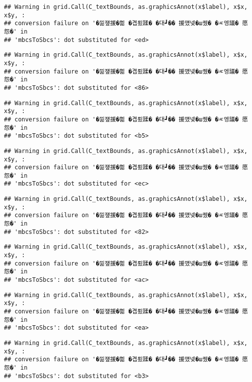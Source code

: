 \documentclass[
]{article}
\begin{document}
\begin{verbatim}
## Warning in grid.Call(C_textBounds, as.graphicsAnnot(x$label), x$x, x$y, :
## conversion failure on '�낆쟾援�쁾 �곕룄蹂� �대┛�� 援먰넻�ш퀬� �ㅼ엥議� 愿怨�' in
## 'mbcsToSbcs': dot substituted for <ed>
\end{verbatim}

\begin{verbatim}
## Warning in grid.Call(C_textBounds, as.graphicsAnnot(x$label), x$x, x$y, :
## conversion failure on '�낆쟾援�쁾 �곕룄蹂� �대┛�� 援먰넻�ш퀬� �ㅼ엥議� 愿怨�' in
## 'mbcsToSbcs': dot substituted for <86>
\end{verbatim}

\begin{verbatim}
## Warning in grid.Call(C_textBounds, as.graphicsAnnot(x$label), x$x, x$y, :
## conversion failure on '�낆쟾援�쁾 �곕룄蹂� �대┛�� 援먰넻�ш퀬� �ㅼ엥議� 愿怨�' in
## 'mbcsToSbcs': dot substituted for <b5>
\end{verbatim}

\begin{verbatim}
## Warning in grid.Call(C_textBounds, as.graphicsAnnot(x$label), x$x, x$y, :
## conversion failure on '�낆쟾援�쁾 �곕룄蹂� �대┛�� 援먰넻�ш퀬� �ㅼ엥議� 愿怨�' in
## 'mbcsToSbcs': dot substituted for <ec>
\end{verbatim}

\begin{verbatim}
## Warning in grid.Call(C_textBounds, as.graphicsAnnot(x$label), x$x, x$y, :
## conversion failure on '�낆쟾援�쁾 �곕룄蹂� �대┛�� 援먰넻�ш퀬� �ㅼ엥議� 愿怨�' in
## 'mbcsToSbcs': dot substituted for <82>
\end{verbatim}

\begin{verbatim}
## Warning in grid.Call(C_textBounds, as.graphicsAnnot(x$label), x$x, x$y, :
## conversion failure on '�낆쟾援�쁾 �곕룄蹂� �대┛�� 援먰넻�ш퀬� �ㅼ엥議� 愿怨�' in
## 'mbcsToSbcs': dot substituted for <ac>
\end{verbatim}

\begin{verbatim}
## Warning in grid.Call(C_textBounds, as.graphicsAnnot(x$label), x$x, x$y, :
## conversion failure on '�낆쟾援�쁾 �곕룄蹂� �대┛�� 援먰넻�ш퀬� �ㅼ엥議� 愿怨�' in
## 'mbcsToSbcs': dot substituted for <ea>
\end{verbatim}

\begin{verbatim}
## Warning in grid.Call(C_textBounds, as.graphicsAnnot(x$label), x$x, x$y, :
## conversion failure on '�낆쟾援�쁾 �곕룄蹂� �대┛�� 援먰넻�ш퀬� �ㅼ엥議� 愿怨�' in
## 'mbcsToSbcs': dot substituted for <b3>
\end{verbatim}
\end{document}
